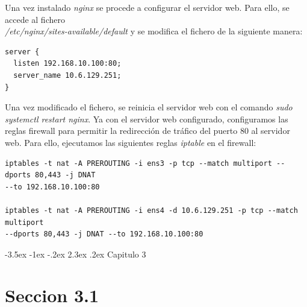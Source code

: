 \documentclass[11pt]{report} %
\makeatletter
\renewcommand\chapter{\@startsection{chapter}{0}{\z@}%
    {-3.5ex \@plus -1ex \@minus -.2ex}%
    {2.3ex \@plus.2ex}%
    {\normalfont\Large\bfseries}}
\makeatother
\begin{document}
Una vez instalado \emph{nginx} se procede a configurar el servidor web. Para ello, se accede al fichero \\
\emph{/etc/nginx/sites-available/default} y se modifica el fichero de la siguiente manera:

\begin{verbatim}
server {
  listen 192.168.10.100:80;
  server_name 10.6.129.251;
}
\end{verbatim}

Una vez modificado el fichero, se reinicia el servidor web con el comando \emph{sudo systemctl restart nginx}. Ya 
con el servidor web configurado, configuramos las reglas firewall para permitir la redirección de tráfico del puerto
80 al servidor web. Para ello, ejecutamos las siguientes reglas \emph{iptable} en el firewall:

\begin{verbatim}
iptables -t nat -A PREROUTING -i ens3 -p tcp --match multiport --dports 80,443 -j DNAT 
--to 192.168.10.100:80

iptables -t nat -A PREROUTING -i ens4 -d 10.6.129.251 -p tcp --match multiport 
--dports 80,443 -j DNAT --to 192.168.10.100:80
\end{verbatim}





\cleardoublepage


\chapter{Capitulo 3}
\section{Seccion 3.1}
\end{document}
